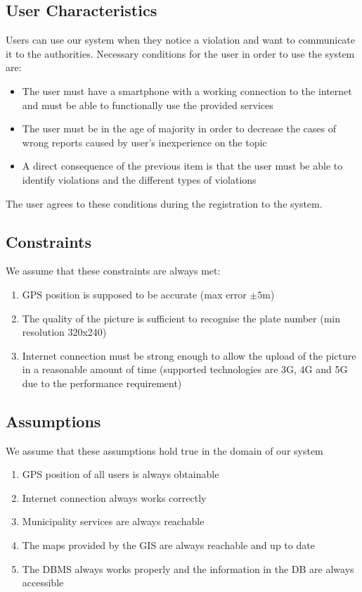 \subsection{User Characteristics}
	Users can use our system when they notice a violation and want to communicate it to the authorities. Necessary conditions for the user in order to use the system are:
 	\begin{itemize}
 		\item The user must have a smartphone with a working connection to the internet and must be able to functionally use the provided services
 		\item The user must be in the age of majority in order to decrease the cases of wrong reports caused by user's inexperience on the topic 
 		\item A direct consequence of the previous item is that the user must be able to identify violations and the different types of violations
 	\end{itemize}
 	The user agrees to these conditions during the registration to the system.
 	
\subsection{Constraints}
\label{sec:constraints}
	We assume that these constraints are always met:
	\begin{enumerate}[label=\textbf{C\arabic*}]
		\item GPS position is supposed to be accurate (max error $\pm5$m)
		\item The quality of the picture is sufficient to recognise the plate number (min resolution 320x240)
		\item Internet connection must be strong enough to allow the upload of the picture in a reasonable amount of time (supported technologies are 3G, 4G and 5G due to the performance requirement)
	\end{enumerate}
	
\subsection{Assumptions}
	We assume that these assumptions hold true in the domain of our system 
	\begin{enumerate}[label=\textbf{	DA\arabic*}]
		\item GPS position of all users is always obtainable
		\item Internet connection always works correctly
		\item Municipality services are always reachable
		\item The maps provided by the GIS are always reachable and up to date
		\item The DBMS always works properly and the information in the DB are always accessible
	\end{enumerate}
		
\clearpage
